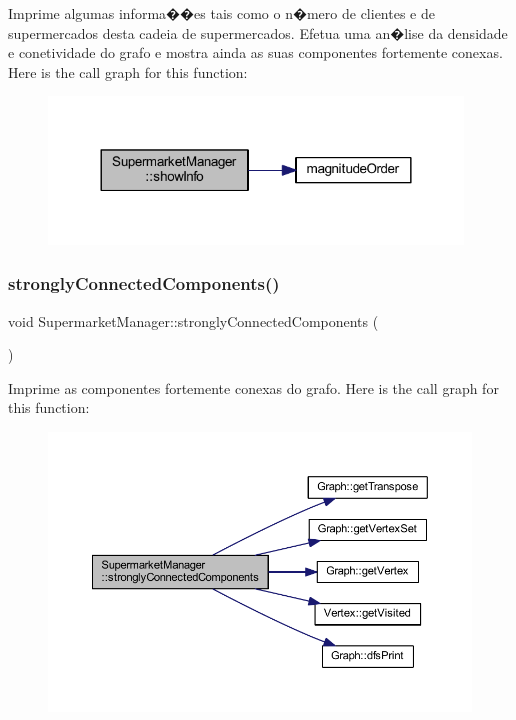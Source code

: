 Imprime algumas informa��es tais como o n�mero de clientes e de supermercados desta cadeia de supermercados. Efetua uma an�lise da densidade e conetividade do grafo e mostra ainda as suas componentes fortemente conexas. Here is the call graph for this function\+:
\nopagebreak
\begin{figure}[H]
\begin{center}
\leavevmode
\includegraphics[width=312pt]{class_supermarket_manager_a3bbfc2db4c66bbaab3a5536c7205a818_cgraph}
\end{center}
\end{figure}
\mbox{\label{class_supermarket_manager_a325c08bab73c6ddfe61dbb600c8d55fd}} 
\subsubsection{\texorpdfstring{strongly\+Connected\+Components()}{stronglyConnectedComponents()}}
{\footnotesize\ttfamily void Supermarket\+Manager\+::strongly\+Connected\+Components (\begin{DoxyParamCaption}{ }\end{DoxyParamCaption})}

Imprime as componentes fortemente conexas do grafo. Here is the call graph for this function\+:
\nopagebreak
\begin{figure}[H]
\begin{center}
\leavevmode
\includegraphics[width=350pt]{class_supermarket_manager_a325c08bab73c6ddfe61dbb600c8d55fd_cgraph}
\end{center}
\end{figure}


